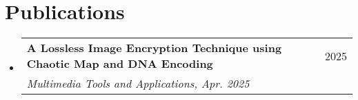 \documentclass[a4paper,11pt]{article}
\makeatletter
\newcommand{\resumeSubheading}[4]{
    \vspace{-2pt}\item
    \begin{tabular*}{0.97\textwidth}{l@{\extracolsep{\fill}}r}
        \textbf{#1} & #2 \\
        \textit{\small#3} & \textit{\small #4} \\
    \end{tabular*}\vspace{-7pt}
}
\newcommand{\resumeSubHeadingListStart}{\begin{itemize}[leftmargin=5pt, label={}]}
\newcommand{\resumeSubHeadingListEnd}{\end{itemize}}
\makeatother
\begin{document}
\section{Publications}
\resumeSubHeadingListStart
\resumeSubheading
{A Lossless Image Encryption Technique using Chaotic Map and DNA Encoding}{2025}
{Multimedia Tools and Applications, Apr. 2025}{}
\resumeSubHeadingListEnd


\end{document}
